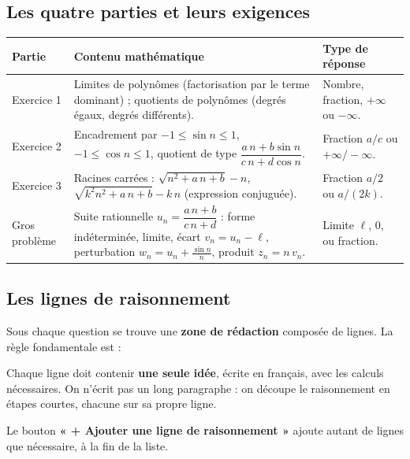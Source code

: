 \documentclass[11pt,a4paper]{article}
\begin{document}
\subsection{Les quatre parties et leurs exigences}

\begin{center}
\renewcommand{\arraystretch}{1.3}
\begin{tabular}{@{}p{3.1cm}p{7.8cm}p{3.5cm}@{}}
\toprule
\textbf{Partie} & \textbf{Contenu mathématique} & \textbf{Type de réponse} \\
\midrule
Exercice 1 &
Limites de polynômes (factorisation par le terme dominant) ; quotients de
polynômes (degrés égaux, degrés différents). &
Nombre, fraction, \(+\infty\) ou \(-\infty\). \\
\addlinespace
Exercice 2 &
Encadrement par \(-1 \leqslant \sin n \leqslant 1\), \(-1 \leqslant \cos n \leqslant 1\),
quotient de type \(\dfrac{a\,n + b\sin n}{c\,n + d\cos n}\). &
Fraction \(a/c\) ou \(+\infty/-\infty\). \\
\addlinespace
Exercice 3 &
Racines carrées : \(\sqrt{n^2 + a\,n + b} - n\), \(\sqrt{k^2 n^2 + a\,n + b} - k\,n\)
(expression conjuguée). &
Fraction \(a/2\) ou \(a/(2k)\). \\
\addlinespace
Gros problème &
Suite rationnelle \(u_n = \dfrac{a\,n+b}{c\,n+d}\) : forme indéterminée, limite,
écart \(v_n = u_n - \ell\), perturbation \(w_n = u_n + \tfrac{\sin n}{n}\),
produit \(z_n = n\,v_n\). &
Limite \(\ell\), \(0\), ou fraction. \\
\bottomrule
\end{tabular}
\end{center}

\subsection{Les lignes de raisonnement}

Sous chaque question se trouve une \textbf{zone de rédaction} composée de lignes.
La règle fondamentale est :

\begin{retenir}[Une idée = une ligne]
Chaque ligne doit contenir \textbf{une seule idée}, écrite en français, avec les
calculs nécessaires. On n'écrit pas un long paragraphe : on découpe le
raisonnement en étapes courtes, chacune sur sa propre ligne.
\end{retenir}

Le bouton \textbf{« + Ajouter une ligne de raisonnement »} ajoute autant de
lignes que nécessaire, à la fin de la liste.
\end{document}

